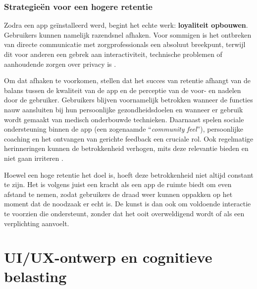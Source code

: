 \vspace{1em}

\subsubsection{Strategieën voor een hogere retentie}
\label{subsubsec:strat-voor-hogerere-retentie}

\vspace{1em}

Zodra een app geïnstalleerd werd, begint het echte werk: \textbf{loyaliteit opbouwen}. Gebruikers kunnen namelijk razendsnel afhaken. Voor sommigen is het ontbreken van directe communicatie met zorgprofessionals een absoluut breekpunt, terwijl dit voor anderen een gebrek aan interactiviteit, technische problemen of aanhoudende zorgen over privacy is \autocite{Portz2024}.

\vspace{1em}

Om dat afhaken te voorkomen, stellen \textcite{Portz2024} dat het succes van retentie afhangt van de balans tussen de kwaliteit van de app en de perceptie van de voor- en nadelen door de gebruiker. Gebruikers blijven voornamelijk betrokken wanneer de functies nauw aansluiten bij hun persoonlijke gezondheidsdoelen en wanneer er gebruik wordt gemaakt van medisch onderbouwde technieken. Daarnaast spelen sociale ondersteuning binnen de app (een zogenaamde “\textit{community feel}”), persoonlijke coaching en het ontvangen van gerichte feedback een cruciale rol. Ook regelmatige herinneringen kunnen de betrokkenheid verhogen, mits deze relevantie bieden en niet gaan irriteren \autocite{Portz2024}.

\vspace{1em}

Hoewel een hoge retentie het doel is, hoeft deze betrokkenheid niet altijd constant te zijn. Het is volgens \textcite{Portz2024} juist een kracht als een app de ruimte biedt om even afstand te nemen, zodat gebruikers de draad weer kunnen oppakken op het moment dat de noodzaak er echt is. De kunst is dan ook om voldoende interactie te voorzien die ondersteunt, zonder dat het ooit overweldigend wordt of als een verplichting aanvoelt.

\newpage




\section{UI/UX-ontwerp en cognitieve belasting}
\label{sec:ux-ontwerp}

